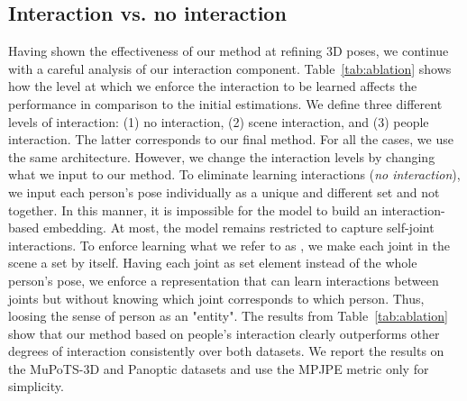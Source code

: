 \subsection{Interaction vs. no interaction}
Having shown the effectiveness of our method at refining 3D poses, we continue with a careful analysis of our interaction component. Table~\ref{tab:ablation} shows how the level at which we enforce the interaction to be learned affects the performance in comparison to the initial estimations. We define three different levels of interaction: (1) no interaction, (2) scene interaction, and (3) people interaction. The latter corresponds to our final method. For all the cases, we use the same architecture. However, we change the interaction levels by changing what we input to our method. To eliminate learning interactions ({\em no interaction}), we input each person's pose individually as a unique and different set and not together. In this manner, it is impossible for the model to build an interaction-based embedding. At most, the model remains restricted to capture self-joint interactions. To enforce learning what we refer to as , we make each joint in the scene a set by itself. Having each joint as set element instead of the whole person's pose, we enforce a representation that can learn interactions between joints but without knowing which joint corresponds to which person. Thus, loosing the sense of person as an "entity". The results from Table~\ref{tab:ablation} show that our method based on people's interaction clearly outperforms other degrees of interaction consistently over both datasets. We report the results on the MuPoTS-3D and Panoptic datasets and use the MPJPE metric only for simplicity. 

